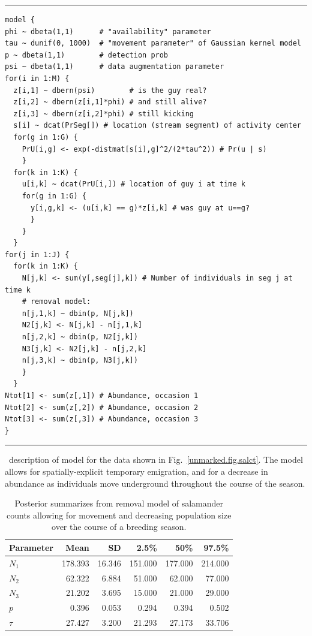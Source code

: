 \begin{panel}
\centering
\rule[0.05in]{\textwidth}{.03in}
\begin{small}
\begin{verbatim}
model {
phi ~ dbeta(1,1)      # "availability" parameter
tau ~ dunif(0, 1000)  # "movement parameter" of Gaussian kernel model
p ~ dbeta(1,1)        # detection prob
psi ~ dbeta(1,1)      # data augmentation parameter
for(i in 1:M) {
  z[i,1] ~ dbern(psi)        # is the guy real?
  z[i,2] ~ dbern(z[i,1]*phi) # and still alive?
  z[i,3] ~ dbern(z[i,2]*phi) # still kicking
  s[i] ~ dcat(PrSeg[]) # location (stream segment) of activity center
  for(g in 1:G) {
    PrU[i,g] <- exp(-distmat[s[i],g]^2/(2*tau^2)) # Pr(u | s)
    }
  for(k in 1:K) {
    u[i,k] ~ dcat(PrU[i,]) # location of guy i at time k
    for(g in 1:G) {
      y[i,g,k] <- (u[i,k] == g)*z[i,k] # was guy at u==g?
      }
    }
  }
for(j in 1:J) {
  for(k in 1:K) {
    N[j,k] <- sum(y[,seg[j],k]) # Number of individuals in seg j at time k
    # removal model:
    n[j,1,k] ~ dbin(p, N[j,k])
    N2[j,k] <- N[j,k] - n[j,1,k]
    n[j,2,k] ~ dbin(p, N2[j,k])
    N3[j,k] <- N2[j,k] - n[j,2,k]
    n[j,3,k] ~ dbin(p, N3[j,k])
    }
  }
Ntot[1] <- sum(z[,1]) # Abundance, occasion 1
Ntot[2] <- sum(z[,2]) # Abundance, occasion 2
Ntot[3] <- sum(z[,3]) # Abundance, occasion 3
}
\end{verbatim}
\end{small}
\rule[0.05in]{\textwidth}{.03in}
\caption{\bugs~description of model for the data shown in
  Fig.~\ref{unmarked.fig.salct}. The model allows for
  spatially-explicit temporary emigration, and for a decrease in
  abundance as individuals move underground throughout the course of
  the season.}
\label{unmarked.panel.sal}
\end{panel}





\begin{table}
  \centering
  \caption{Posterior summarizes from removal model of salamander
    counts allowing for movement and decreasing population size over
    the course of a breeding season.}
  \begin{tabular}{lrrrrr}
    \hline
    Parameter & Mean & SD & 2.5\% & 50\% & 97.5\% \\
    \hline
    $N_1$ & 178.393 &  16.346 & 151.000 & 177.000 & 214.000\\
    $N_2$ &  62.322 &   6.884 &  51.000 &  62.000 &  77.000\\
    $N_3$ &  21.202 &   3.695 &  15.000 &  21.000 &  29.000\\
    $p$ &   0.396 &   0.053 &   0.294 &   0.394 &   0.502\\
    $\tau$ &  27.427 &   3.200 &  21.293 &  27.173 &  33.706\\
    \hline
  \end{tabular}
\end{table}


